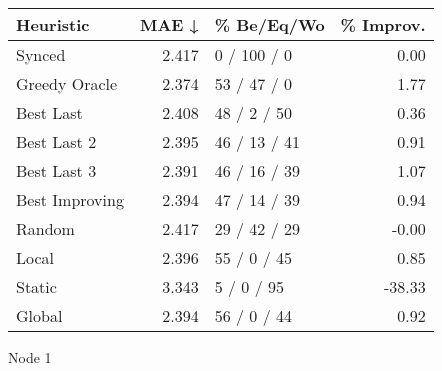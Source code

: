 \begin{tabular}{lrlr}
\toprule
\textbf{Heuristic} & \textbf{MAE ↓} & \textbf{\% Be/Eq/Wo} & \textbf{\% Improv.} \\
\midrule
            Synced &          2.417 &          0 / 100 / 0 &                0.00 \\
     Greedy Oracle &          2.374 &          53 / 47 / 0 &                1.77 \\
         Best Last &          2.408 &          48 / 2 / 50 &                0.36 \\
       Best Last 2 &          2.395 &         46 / 13 / 41 &                0.91 \\
       Best Last 3 &          2.391 &         46 / 16 / 39 &                1.07 \\
    Best Improving &          2.394 &         47 / 14 / 39 &                0.94 \\
            Random &          2.417 &         29 / 42 / 29 &               -0.00 \\
             Local &          2.396 &          55 / 0 / 45 &                0.85 \\
            Static &          3.343 &           5 / 0 / 95 &              -38.33 \\
            Global &          2.394 &          56 / 0 / 44 &                0.92 \\
\bottomrule
\end{tabular}
\caption{Node 1}
\label{tab:hr_non_lr01_le2_bs4_1}
